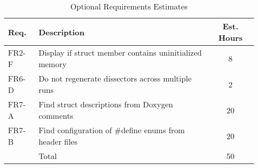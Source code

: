 \begin{table}[htbp] \small \center
\caption{Optional Requirements Estimates\label{tab:prodbacklog2}}
\begin{tabularx}{\textwidth}{l X c}
	\toprule
	Req. & Description & Est. Hours \\
	\midrule	
	FR2-F & Display if struct member contains uninitialized memory & 8 \\
	FR6-D & Do not regenerate dissectors across multiple runs & 2 \\
	FR7-A & Find struct descriptions from Doxygen comments & 20 \\
	FR7-B & Find configuration of \#define enums from header files & 20 \\
	\midrule
	& Total & 50 \\
	\bottomrule
\end{tabularx}
\end{table}

